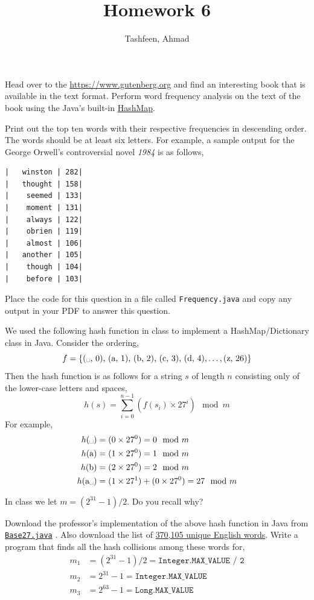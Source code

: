 \documentclass{homework}
\author{Tashfeen, Ahmad}
\title{Homework 6}
\newcommand\providecode[1]{%
  \href{https://tashfeen.org/raw/share/ds/#1}{\texttt{#1}}
}
\begin{document}
 \maketitle

\question Head over to the \url{https://www.gutenberg.org} and find an
interesting book that is available in the text format. Perform word
frequency analysis on the text of the book using the Java's built-in
\href{https://docs.oracle.com/javase/8/docs/api/java/util/HashMap.html}{HashMap}.

Print out the top ten words with their respective frequencies in
descending order. The words should be at least six letters. For
example, a sample output for the George Orwell's controversial novel
\textit{1984} is as follows,

\begin{verbatim}
|   winston | 282|
|   thought | 158|
|    seemed | 133|
|    moment | 131|
|    always | 122|
|    obrien | 119|
|    almost | 106|
|   another | 105|
|    though | 104|
|    before | 103|
\end{verbatim}

Place the code for this question in a file called
\texttt{Frequency.java} and copy any output in your PDF to answer this
question.

\question We used the following hash function in class to implement a
HashMap/Dictionary class in Java. Consider the ordering,
\[
  f = \{\text{(\textvisiblespace, 0), (a, 1), (b, 2), (c, 3),
    (d, 4),}\hdots, \text{(z, 26)}\}
\]
Then the hash function is as follows for a string $s$ of length $n$
consisting only of the lower-case letters and spaces,
\[
  h(s) = \sum_{i=0}^{n-1}(f(s_{i})\times 27^i) \mod m
\]
For example,
\begin{align*}
  h(\text{\textvisiblespace})  & =(0 \times 27^0)=0 \mod m                  \\
  h(\text{a})                  & =(1 \times 27^0)=1 \mod m                  \\
  h(\text{b})                  & =(2 \times 27^0)=2 \mod m                  \\
  h(\text{a\textvisiblespace}) & =(1 \times 27^1)+(0 \times 27^0)=27 \mod m
\end{align*}

In class we let $m=(2^{31}-1)/2$. Do you recall why?

Download the professor's implementation of the above hash function in
Java from \providecode{Base27.java}. Also download the list of
\href{https://raw.githubusercontent.com/dwyl/english-words/master/words_alpha.txt}
{370,105 unique English words}. Write a program that finds all the
hash collisions among these words for,
\begin{align*}
  m_1 & = (2^{31}-1)/2 = \texttt{Integer.MAX\_VALUE / 2} \\
  m_2 & = 2^{31}-1 = \texttt{Integer.MAX\_VALUE}         \\
  m_3 & = 2^{63}-1 = \texttt{Long.MAX\_VALUE}            \\
\end{align*}
\end{document}
